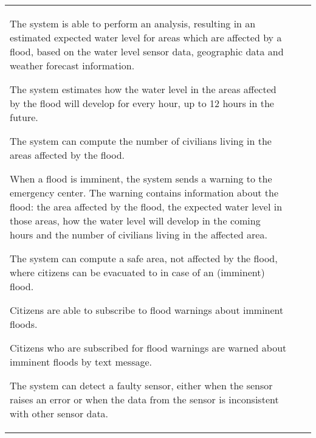 \begin{longtable}{L{0.1\textwidth} L{0.12\textwidth} L{0.78\textwidth}}
    { The system is able to perform an analysis, resulting in an estimated expected water level for  areas which are affected by a flood, based on the water level sensor data, geographic data and weather forecast information. }
    
    { The system estimates how the water level in the areas affected by the flood will develop for every hour, up to 12 hours in the future. } %
    
    { The system can compute the number of civilians living in the areas affected by the flood. }
    
	{ When a flood is imminent, the system sends a warning to the emergency center. The warning contains information about the flood: the area affected by the flood, the expected water level in those areas, how the water level will develop in the coming hours and the number of civilians living in the affected area. }
    
    { The system can compute a safe area, not affected by the flood, where citizens can be evacuated to in case of an (imminent) flood. }
    
    
    { Citizens are able to subscribe to flood warnings about imminent floods. }
    
    { Citizens who are subscribed for flood warnings are warned about imminent floods by text message. }
    
	
    { The system can detect a faulty sensor, either when the sensor raises an error or when the data from the sensor is inconsistent with other sensor data. }
    

\end{longtable}
